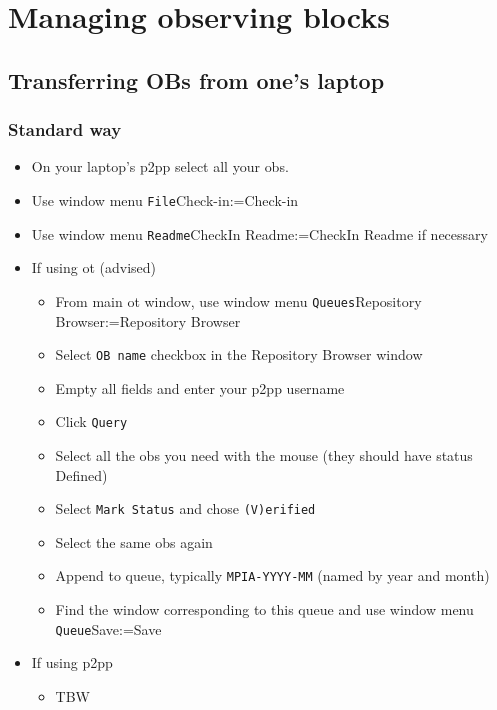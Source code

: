 \documentclass[11pt,fleqn,a4paper]{book}
\makeatletter
\def\menu#1#2{\texttt{#1}\ifx{}#2\else\@for\@x:=#2\do{$\rightarrow$\texttt{\@x}}\fi}
\def\wmenu#1#2{window menu \menu{#1}{#2}}
\makeatother
\begin{document}

\chapter{Managing observing blocks}
\label{chap:ob}

\section{Transferring OBs from one's laptop}

\subsection{Standard way}

\begin{itemize}
\item On your laptop's \gls{p2pp} select all your \glspl{ob}.
\item Use \wmenu{File}{Check-in}
\item Use \wmenu{Readme}{CheckIn Readme} if necessary
\item If using \gls{ot} (advised)
  \begin{itemize}
    \item From main \gls{ot} window, use \wmenu{Queues}{Repository Browser}
    \item Select \texttt{OB name} checkbox in the Repository Browser window
    \item Empty all fields and enter your \gls{p2pp} username  
    \item Click \texttt{Query}
    \item Select all the \glspl{ob} you need with the mouse (they should have status Defined)
    \item Select \texttt{Mark Status} and chose \texttt{(V)erified}
    \item Select the same \glspl{ob} again
    \item Append to queue, typically \texttt{MPIA-YYYY-MM} (named by year and month)
    \item Find the window corresponding to this queue and use \wmenu{Queue}{Save}
  \end{itemize}
\item If using \gls{p2pp}
  \begin{itemize}
    \item TBW
  \end{itemize}
\end{itemize}
\end{document}
